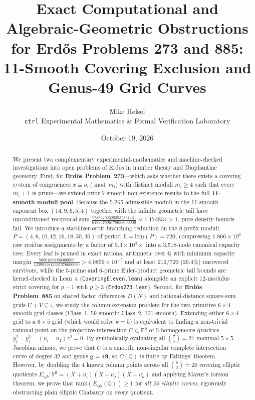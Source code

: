 \documentclass[10pt,twocolumn]{article}
\title{\textbf{Exact Computational and Algebraic-Geometric Obstructions\\
for Erd\H{o}s Problems 273 and 885:\\
11-Smooth Covering Exclusion and Genus-49 Grid Curves}}
\author{Mike Helsel\\
\small \texttt{ctrl} Experimental Mathematics \& Formal Verification Laboratory}
\date{October 19, 2026}
\theoremstyle{definition}
\begin{document}
\maketitle

\begin{abstract}
We present two complementary experimental-mathematics and machine-checked investigations into open problems of Erd\H{o}s in number theory and Diophantine geometry.
First, for \textbf{Erd\H{o}s Problem~273}---which asks whether there exists a covering system of congruences $x \equiv a_i \pmod{m_i}$ with distinct moduli $m_i \ge 4$ such that every $m_i + 1$ is prime---we extend prior 7-smooth non-existence results to the full \textbf{11-smooth moduli pool}. Because the 5,265 admissible moduli in the 11-smooth exponent box $(14,9,6,5,4)$ together with the infinite geometric tail have unconditioned reciprocal sum $\frac{728347923255532331431}{619957906178688000000} \approx 1.174834 > 1$, pure density bounds fail. We introduce a stabilizer-orbit branching reduction on the 8 prefix moduli $P = (4, 6, 10, 12, 16, 18, 30, 36)$ of period $L = \mathrm{lcm}(P) = 720$, compressing $1.866 \times 10^8$ raw residue assignments by a factor of $5.3 \times 10^4\times$ into a 3,518-node canonical capacity tree. Every leaf is pruned in exact rational arithmetic over $\mathbb{Q}$ with minimum capacity margin $\frac{50661803066306609}{1239915812357376000000} > 4.0859 \times 10^{-5}$ and at least $212/720$ ($29.4\%$) uncovered survivors, while the 5-prime and 6-prime Euler-product geometric tail bounds are kernel-checked in Lean~4 (\texttt{CoveringEleven.lean}) alongside an explicit 12-modulus strict covering for $p - 1$ with $p \ge 3$ (\texttt{Erdos273.lean}).
Second, for \textbf{Erd\H{o}s Problem~885} on shared factor differences $D(N)$ and rational-distance square-sum grids $U + V \subseteq \square$, we study the column-extension problem for the two primitive $6 \times 4$ smooth grid classes (Class~1, 59-smooth; Class~2, 101-smooth). Extending either $6 \times 4$ grid to a $6 \times 5$ grid (which would solve $k=5$) is equivalent to finding a non-trivial rational point on the projective intersection $C \subset \mathbb{P}^6$ of 5 homogeneous quadrics $y_i^2 - y_1^2 - (u_i - u_1)z^2 = 0$. By symbolically evaluating all $\binom{7}{5} = 21$ maximal $5 \times 5$ Jacobian minors, we prove that $C$ is a smooth, non-singular complete intersection curve of degree $32$ and genus $\mathbf{g = 49}$, so $C(\mathbb{Q})$ is finite by Faltings' theorem. However, by doubling the 4 known column points across all $\binom{6}{3} = 20$ covering elliptic quotients $E_{ijk} : Y^2 = (X+u_i)(X+u_j)(X+u_k)$ and applying Mazur's torsion theorem, we prove that $\mathrm{rank}(E_{ijk}(\mathbb{Q})) \ge 1$ for \emph{all 20 elliptic curves}, rigorously obstructing plain elliptic Chabauty on every quotient.
\end{abstract}
\end{document}

